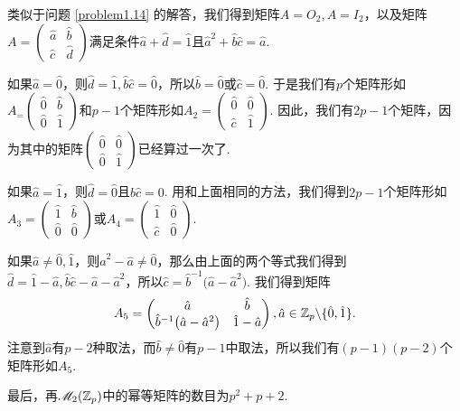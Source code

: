 \begin{solution}
  类似于问题 \ref{problem1.14} 的解答，我们得到矩阵$A=O_2,A=I_2$，以及矩阵$A=\begin{pmatrix}
    \hat a & \hat b \\
    \hat c & \hat d
  \end{pmatrix}$满足条件$\hat a+\hat d=\hat1$且$\hat a^2+\hat b\hat c=\hat a$.

  如果$\hat a=\hat 0$，则$\hat d=\hat1,\hat b\hat c=\hat 0$，所以$\hat b=\hat 0$或$\hat c=\hat 0$. 于是我们有$p$个矩阵形如$A_=\begin{pmatrix}
    \hat 0 & \hat b \\
    \hat 0 & \hat 1
  \end{pmatrix}$和$p-1$个矩阵形如$A_2=\begin{pmatrix}
    \hat 0 & \hat 0 \\
    \hat c & \hat 1
  \end{pmatrix}$. 因此，我们有$2p-1$个矩阵，因为其中的矩阵$\begin{pmatrix}
    \hat 0 & \hat 0 \\
    \hat 0 & \hat 1
  \end{pmatrix}$已经算过一次了.

  如果$\hat a=\hat1$，则$\hat d=\hat0$且$\hat b\hat c=0$. 用和上面相同的方法，我们得到$2p-1$个矩阵形如$A_3=\begin{pmatrix}
    \hat 1 & \hat b\\
    \hat 0 & \hat 0
  \end{pmatrix}$或$A_4=\begin{pmatrix}
    \hat 1 & \hat 0 \\
    \hat c & \hat 0
  \end{pmatrix}$.

  如果$\hat a\ne\hat 0,\hat1$，则$\hat a^2-\hat a\ne\hat 0$，那么由上面的两个等式我们得到$\hat d=\hat 1 - \hat a,\hat b\hat c-\hat a-\hat a^2$，所以$\hat c=\hat b^{-1}\big(\hat a-\hat a^2\big)$. 我们得到矩阵
  \[
    A_5 = \begin{pmatrix}
      \hat a & \hat b \\
      \hat b^{-1}\big( \hat a-\hat a^2 \big) & \hat 1 - \hat a
    \end{pmatrix},\hat a\in\mathbb Z_p\backslash\{\hat0,\hat1\}.
  \]
  注意到$\hat a$有$p-2$种取法，而$\hat b\ne\hat 0$有$p-1$中取法，所以我们有$(p-1)(p-2)$个矩阵形如$A_5$.

  最后，再$\mathscr M_2(\mathbb Z_p)$中的幂等矩阵的数目为$p^2+p+2$.
\end{solution}

